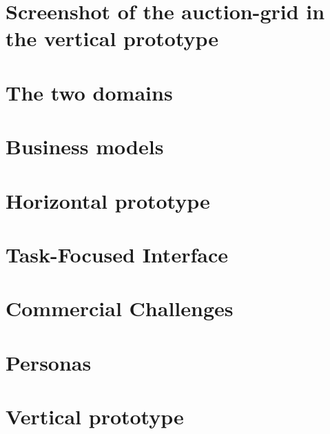 \documentclass[a4paper,11pt,fleqn,dvipsnames,oneside,openright]{memoir}
\begin{document}
\section{Screenshot of the auction-grid in the vertical prototype}
\label{AppScreenshots}

\newpage

\section{The two domains}
\label{Two domians}

\newpage
\section{Business models}
\label{BusinessModels}


\section{Horizontal prototype}
\label{HorizontalPrototype}


\section{Task-Focused Interface}
\label{TaskFocusedInterface}


\section{Commercial Challenges}
\label{CommercialChallenges}


\section{Personas}
\label{Personas}


\section{Vertical prototype}
\label{FullVerticalPrototype}

\end{document}
